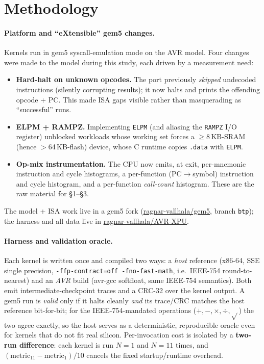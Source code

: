 \documentclass[11pt]{article}
\newcommand{\code}[1]{\texttt{#1}}
\begin{document}
\section{Methodology}\label{sec:method}

\paragraph{Platform and ``eXtensible'' gem5 changes.}
Kernels run in gem5 syscall-emulation mode on the AVR model. Four changes were made to the model during
this study, each driven by a measurement need:
\begin{itemize}
  \item \textbf{Hard-halt on unknown opcodes.} The port previously \emph{skipped} undecoded instructions
  (silently corrupting results); it now halts and prints the offending opcode + PC. This made ISA gaps
  visible rather than masquerading as ``successful'' runs.
  \item \textbf{ELPM + RAMPZ.} Implementing \code{ELPM} (and aliasing the \code{RAMPZ} I/O register)
  unblocked workloads whose working set forces a $\geq$8\,KB-SRAM (hence $>$64\,KB-flash) device, whose
  C runtime copies \code{.data} with \code{ELPM}.
  \item \textbf{Op-mix instrumentation.} The CPU now emits, at exit, per-mnemonic instruction and cycle
  histograms, a per-function (PC$\rightarrow$symbol) instruction and cycle histogram, and a per-function
  \emph{call-count} histogram. These are the raw material for \S1--\S3.
\end{itemize}
The model + ISA work live in a gem5 fork (\href{https://github.com/ragnar-vallhala/gem5}{ragnar-vallhala/gem5},
branch \code{btp}); the harness and all data live in
\href{https://github.com/ragnar-vallhala/AVR-XPU}{ragnar-vallhala/AVR-XPU}.

\paragraph{Harness and validation oracle.}
Each kernel is written once and compiled two ways: a \emph{host} reference (x86-64, SSE single precision,
\code{-ffp-contract=off -fno-fast-math}, i.e.\ IEEE-754 round-to-nearest) and an \emph{AVR} build
(avr-gcc softfloat, same IEEE-754 semantics). Both emit intermediate-checkpoint traces and a CRC-32 over
the kernel output. A gem5 run is \emph{valid} only if it halts cleanly \emph{and} its trace/CRC matches
the host reference bit-for-bit; for the IEEE-754-mandated operations ($+,-,\times,\div,\sqrt{}$) the two
agree exactly, so the host serves as a deterministic, reproducible oracle even for kernels that do not
fit real silicon. Per-invocation cost is isolated by a \textbf{two-run difference}: each kernel is run
$N{=}1$ and $N{=}11$ times, and $(\text{metric}_{11}-\text{metric}_{1})/10$ cancels the fixed
startup/runtime overhead.
\end{document}
